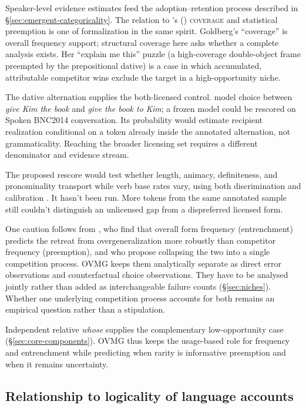 \documentclass[12pt,letterpaper]{article}
\newcommand{\term}[1]{\textsc{#1}}
\newcommand{\mention}[1]{\textit{#1}}
\newcommand{\posscite}[1]{\citeauthor{#1}'s (\citeyear{#1})}
\begin{document}
Speaker-level evidence estimates feed the adoption--retention process described
in \S\ref{sec:emergent-categoricality}. The relation to
\posscite{goldberg2019} \term{coverage} and statistical preemption is one of
formalization in the same spirit. Goldberg's \enquote{coverage} is overall
frequency support; structural coverage here asks whether a complete analysis
exists. Her \enquote{explain me this} puzzle (a
high-coverage double-object frame preempted by the prepositional dative) is a
case in which accumulated, attributable competitor wins exclude the target in a
high-opportunity niche.

The dative alternation supplies the both-licensed control. \textcite{bresnan2007}
model choice between \mention{give Kim the book} and \mention{give the book to
Kim}; a frozen model could be rescored on Spoken BNC2014 conversation. Its
probability would estimate recipient realization conditional on a token already
inside the annotated alternation, not grammaticality. Reaching the broader
licensing set requires a different denominator and evidence stream.

The proposed rescore would test whether length, animacy, definiteness, and
pronominality transport while verb base rates vary, using both discrimination
and calibration \autocite{Goodman1955}. It hasn't been run. More tokens from the
same annotated sample still couldn't distinguish an unlicensed gap from a
dispreferred licensed form.

One caution follows from \textcite{AmbridgeEtAl2015}, who find that overall form
frequency (entrenchment) predicts the retreat from overgeneralization more
robustly than competitor frequency (preemption), and who propose collapsing the
two into a single competition process. OVMG keeps them analytically
separate as direct error observations and counterfactual choice observations.
They have to be analysed jointly rather than added as interchangeable failure
counts (\S\ref{sec:niches}). Whether one underlying competition process accounts
for both remains an empirical question rather than a stipulation.

Independent relative \mention{whose} supplies the complementary
low-opportunity case (\S\ref{sec:core-components}). OVMG thus keeps the
usage-based role for frequency and entrenchment while predicting when rarity is
informative preemption and when it remains uncertainty.

\subsection{Relationship to logicality of language accounts}
\end{document}
